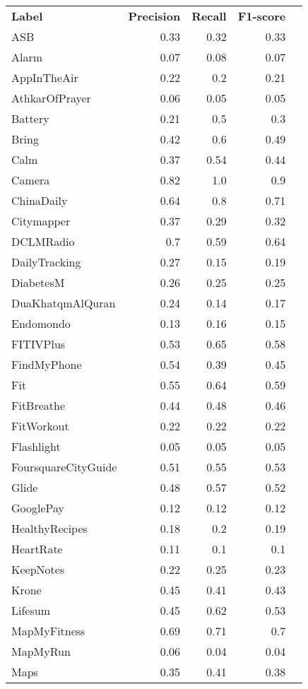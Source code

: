 \begin{tabular}{lrrrr}
    \textbf{Label} & \textbf{Precision} & \textbf{Recall} & \textbf{F1-score} \\
    ASB & 0.33 & 0.32 & 0.33 \\
    Alarm & 0.07 & 0.08 & 0.07 \\
    AppInTheAir & 0.22 & 0.2 & 0.21 \\
    AthkarOfPrayer & 0.06 & 0.05 & 0.05 \\
    Battery & 0.21 & 0.5 & 0.3 \\
    Bring & 0.42 & 0.6 & 0.49 \\
    Calm & 0.37 & 0.54 & 0.44 \\
    Camera & 0.82 & 1.0 & 0.9 \\
    ChinaDaily & 0.64 & 0.8 & 0.71 \\
    Citymapper & 0.37 & 0.29 & 0.32 \\
    DCLMRadio & 0.7 & 0.59 & 0.64 \\
    DailyTracking & 0.27 & 0.15 & 0.19 \\
    DiabetesM & 0.26 & 0.25 & 0.25 \\
    DuaKhatqmAlQuran & 0.24 & 0.14 & 0.17 \\
    Endomondo & 0.13 & 0.16 & 0.15 \\
    FITIVPlus & 0.53 & 0.65 & 0.58 \\
    FindMyPhone & 0.54 & 0.39 & 0.45 \\
    Fit & 0.55 & 0.64 & 0.59 \\
    FitBreathe & 0.44 & 0.48 & 0.46 \\
    FitWorkout & 0.22 & 0.22 & 0.22 \\
    Flashlight & 0.05 & 0.05 & 0.05 \\
    FoursquareCityGuide & 0.51 & 0.55 & 0.53 \\
    Glide & 0.48 & 0.57 & 0.52 \\
    GooglePay & 0.12 & 0.12 & 0.12 \\
    HealthyRecipes & 0.18 & 0.2 & 0.19 \\
    HeartRate & 0.11 & 0.1 & 0.1 \\
    KeepNotes & 0.22 & 0.25 & 0.23 \\
    Krone & 0.45 & 0.41 & 0.43 \\
    Lifesum & 0.45 & 0.62 & 0.53 \\
    MapMyFitness & 0.69 & 0.71 & 0.7 \\
    MapMyRun & 0.06 & 0.04 & 0.04 \\
    Maps & 0.35 & 0.41 & 0.38 \\

\end{tabular}
